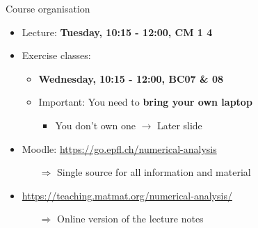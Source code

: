 \begin{frame}{Course organisation}
    \begin{itemize}
        \item \alert{Lecture}: \textbf{Tuesday, 10:15 - 12:00, CM 1 4}
        \vspace{1em}
        \item \alert{Exercise classes}:
            \begin{itemize}
                \vspace{-0.2em}
                \item \textbf{Wednesday, 10:15 - 12:00, BC07 \& 08}
                \vspace{-0.2em}
                \item Important: You need to \textbf{bring your own laptop}
                    \begin{itemize}
                        \vspace{-0.2em}
                        \item You don't own one $\rightarrow$ Later slide
                    \end{itemize}
            \end{itemize}
        \end{itemize}
        \vspace{0.9em}
        \begin{block}{}
        \begin{itemize}
        \item \alert{Moodle:} \url{https://go.epfl.ch/numerical-analysis}
            \begin{itemize}
                \vspace{0.2em}
                \item[$\Rightarrow$] Single source for all information and material
            \end{itemize}
        \end{itemize}
        \end{block}
        \vspace{0.7em}
        \begin{itemize}
        \item \url{https://teaching.matmat.org/numerical-analysis/}
            \begin{itemize}
                \vspace{-0.2em}
                \item[$\Rightarrow$] Online version of the \alert{lecture notes}
            \end{itemize}

\end{itemize}
\end{frame}
